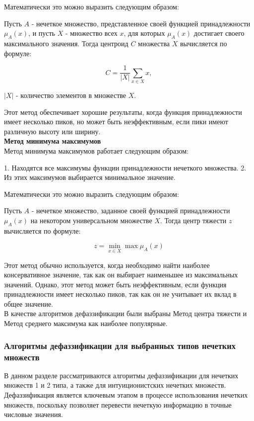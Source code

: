 \documentclass{article}
\begin{document}
    Математически это можно выразить следующим образом:

    Пусть $A$ - нечеткое множество, представленное своей функцией принадлежности $μ_A(x)$, и пусть $X$ - множество всех $x$, для которых $μ_A(x)$ достигает своего максимального значения. Тогда центроид $C$ множества $X$ вычисляется по формуле:

    $$C = \frac{1}{|X|} \sum_{x \in X} x,$$

    $|X|$ - количество элементов в множестве $X$.

    Этот метод обеспечивает хорошие результаты, когда функция принадлежности имеет несколько пиков, но может быть неэффективным, если пики имеют различную высоту или ширину.
    ~\\
    \textbf{Метод минимума максимумов}\\
    Метод минимума максимумов работает следующим образом:

    1. Находятся все максимумы функции принадлежности нечеткого множества.
    2. Из этих максимумов выбирается минимальное значение.

    Математически это можно выразить следующим образом:

    Пусть $A$ - нечеткое множество, заданное своей функцией принадлежности $\mu_A(x)$ на некотором универсальном множестве $X$. Тогда центр тяжести $z$ вычисляется по формуле:

    $$z = \min_{x \in X} \max \mu_A(x)$$

    Этот метод обычно используется, когда необходимо найти наиболее консервативное значение, так как он выбирает наименьшее из максимальных значений. Однако, этот метод может быть неэффективным, если функция принадлежности имеет несколько пиков, так как он не учитывает их вклад в общее значение.
    ~\\
    В качестве алгоритмов дефаззификации были выбраны Метод центра тяжести и Метод среднего максимума как наиболее популярные.

    \subsubsection{Алгоритмы дефаззификации для выбранных типов нечетких множеств}
    В данном разделе рассматриваются алгоритмы дефаззификации для нечетких множеств 1 и 2 типа, а также для интуиционистских нечетких множеств. Дефаззификация является ключевым этапом в процессе использования нечетких множеств, поскольку позволяет перевести нечеткую информацию в точные числовые значения.
\end{document}
